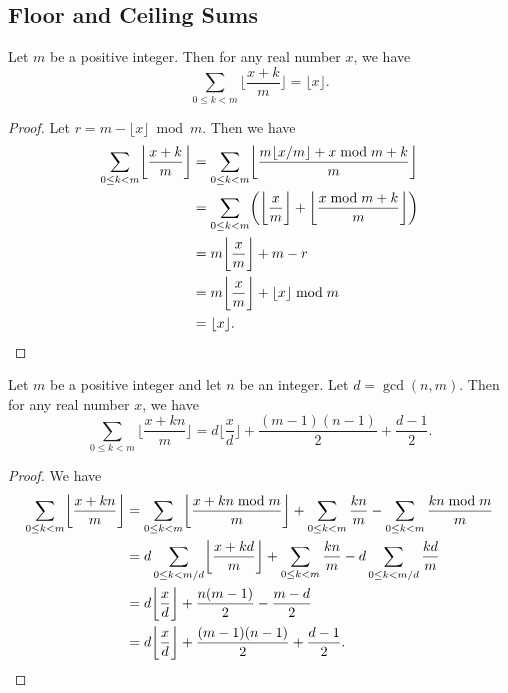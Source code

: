 \documentclass[11pt]{article}
\begin{document}
\subsection{Floor and Ceiling Sums}
\begin{proposition}
  Let $m$ be a positive integer.
  Then for any real number $x$, we have
  \begin{equation*}
    \sum_{0 \leq k < m} \biggl\lfloor \frac{x + k}{m} \biggr\rfloor = \lfloor x \rfloor.
  \end{equation*}
\end{proposition}
\begin{proof}
  Let $r = m - \lfloor x \rfloor \bmod m$.
  Then we have
  \begin{align*}
    \sum_{0 \leq k < m} \biggl\lfloor \frac{x + k}{m} \biggr\rfloor
    &= \sum_{0 \leq k < m} \biggl\lfloor \frac{m \lfloor x/m \rfloor + x \bmod m + k}{m} \biggr\rfloor \\
    &= \sum_{0 \leq k < m} \biggl( \biggl\lfloor \frac{x}{m} \biggr\rfloor + \biggl\lfloor \frac{x \bmod m + k}{m} \biggr\rfloor \biggr) \\
    &= m \biggl\lfloor \frac{x}{m} \biggr\rfloor + m - r \\
    &= m \biggl\lfloor \frac{x}{m} \biggr\rfloor + \lfloor x \rfloor \bmod m \\
    &= \lfloor x \rfloor.
    \qedhere
  \end{align*}
\end{proof}

\begin{theorem}
  Let $m$ be a positive integer and let $n$ be an integer.
  Let $d = \gcd(n, m)$.
  Then for any real number $x$, we have
  \begin{equation*}
    \sum_{0 \leq k < m} \biggl\lfloor \frac{x + kn}{m} \biggr\rfloor = d\biggl\lfloor\frac{x}{d}\biggr\rfloor + \frac{(m-1)(n-1)}{2} + \frac{d-1}{2}.
  \end{equation*}
\end{theorem}
\begin{proof}
  We have
  \begin{align*}
    \sum_{0 \leq k < m} \biggl\lfloor \frac{x + kn}{m} \biggr\rfloor
    &= \sum_{0 \leq k < m} \biggl\lfloor \frac{x + kn \bmod m}{m} \biggr\rfloor + \sum_{0 \leq k < m} \frac{kn}{m} - \sum_{0 \leq k < m} \frac{kn \bmod m}{m} \\
    &= d \sum_{0 \leq k < m/d} \biggl\lfloor \frac{x + kd}{m} \biggr\rfloor + \sum_{0 \leq k < m} \frac{kn}{m} - d \sum_{0 \leq k < m/d} \frac{kd}{m} \\
    &= d \biggl\lfloor \frac{x}{d} \biggr\rfloor + \frac{n(m-1)}{2} - \frac{m - d}{2} \\
    &= d \biggl\lfloor \frac{x}{d} \biggr\rfloor + \frac{(m-1)(n-1)}{2} + \frac{d-1}{2}.
    \qedhere
  \end{align*}
\end{proof}
\end{document}
